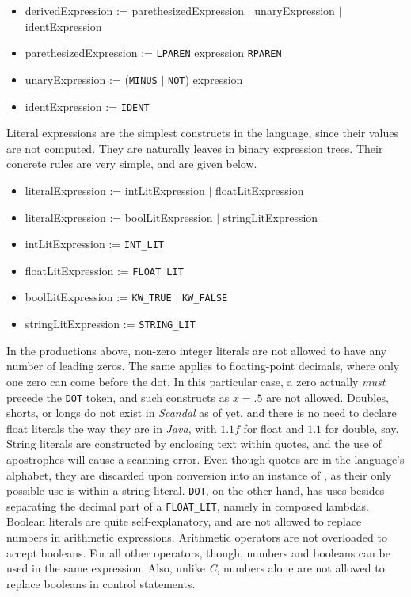 \begin{itemize}
	\item derivedExpression := parethesizedExpression $|$ unaryExpression $|$ identExpression
	\item parethesizedExpression := \texttt{LPAREN} expression \texttt{RPAREN}
	\item unaryExpression := (\texttt{MINUS} $|$ \texttt{NOT}) expression
	\item identExpression := \texttt{IDENT}
\end{itemize}

Literal expressions are the simplest constructs in the language, since their values are not computed. They are naturally leaves in binary expression trees. Their concrete rules are very simple, and are given below.

\begin{itemize}
	\item literalExpression := intLitExpression $|$ floatLitExpression
	\item literalExpression := boolLitExpression $|$ stringLitExpression
	\item intLitExpression := \texttt{INT\_LIT}
	\item floatLitExpression := \texttt{FLOAT\_LIT}
	\item boolLitExpression := \texttt{KW\_TRUE} $|$ \texttt{KW\_FALSE}
	\item stringLitExpression := \texttt{STRING\_LIT}
\end{itemize}

In the productions above, non-zero integer literals are not allowed to have any number of leading zeros. The same applies to floating-point decimals, where only one zero can come before the dot. In this particular case, a zero actually \emph{must} precede the \texttt{DOT} token, and such constructs as $x = .5$ are not allowed. Doubles, shorts, or longs do not exist in \emph{Scandal} as of yet, and there is no need to declare float literals the way they are in \emph{Java}, with $1.1f$ for float and $1.1$ for double, say. String literals are constructed by enclosing text within quotes, and the use of apostrophes will cause a scanning error. Even though quotes are in the language's alphabet, they are discarded upon conversion into an instance of , as their only possible use is within a string literal. \texttt{DOT}, on the other hand, has uses besides separating the decimal part of a \texttt{FLOAT\_LIT}, namely in composed lambdas. Boolean literals are quite self-explanatory, and are not allowed to replace numbers in arithmetic expressions. Arithmetic operators are not overloaded to accept booleans. For all other operators, though, numbers and booleans can be used in the same expression. Also, unlike \emph{C}, numbers alone are not allowed to replace booleans in control statements.

